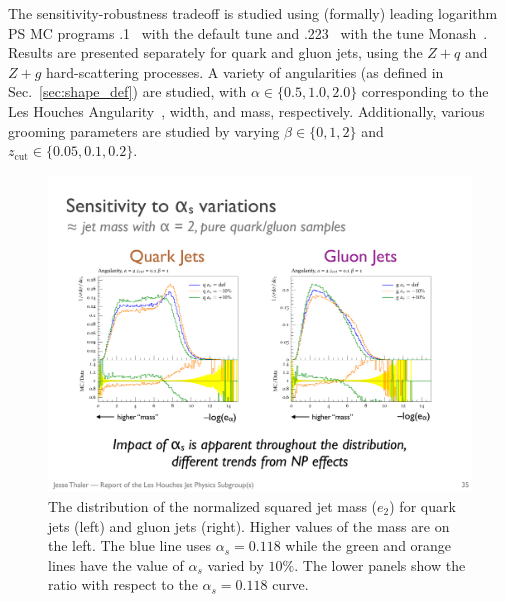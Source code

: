 The sensitivity-robustness tradeoff is studied using (formally) leading logarithm PS MC programs \herwig.1~\cite{Bellm:2015jjp,Reichelt:2017hts} with the default tune and \pythia.223~\cite{Sjostrand:2006za,Sjostrand:2014zea} with the tune Monash~\cite{Skands:2014pea}.  Results are presented separately for quark and gluon jets, using the $Z+q$ and $Z+g$ hard-scattering processes.  A variety of angularities (as defined in Sec.~\ref{sec:shape_def}) are studied, with $\alpha\in\{0.5,1.0, 2.0\}$ corresponding to the Les Houches Angularity~\cite{Gras:2017jty}, width, and mass, respectively.  Additionally, various grooming parameters are studied by varying $\beta\in\{0,1,2\}$ and $z_\text{cut}\in \{0.05,0.1,0.2\}$.  

\begin{figure}[h!]
\begin{center}
\includegraphics[width = 0.99\columnwidth]{figures/sensitivity.pdf}
\end{center}
\caption{The distribution of the normalized squared jet mass ($e_2$)
  for quark jets (left) and gluon jets (right).  Higher values of the
  mass are on the left.  The blue line uses $\alpha_s=0.118$ while the
  green and orange lines have the value of $\alpha_s$ varied by
  $10\%$.  The lower panels show the ratio with respect to the
  $\alpha_s=0.118$ curve.}
\label{fig:sensitivity}
\end{figure}

